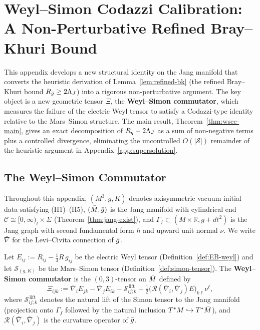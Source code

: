 \section{Weyl--Simon Codazzi Calibration: A Non-Perturbative Refined Bray--Khuri Bound}\label{app:weyl-simon}

This appendix develops a new structural identity on the Jang manifold that converts the heuristic derivation of Lemma~\ref{lem:refined-bk} (the refined Bray--Khuri bound $R_{\bar{g}}\geq 2\Lambda_J$) into a rigorous non-perturbative argument. The key object is a new geometric tensor $\Xi$, the \textbf{Weyl--Simon commutator}, which measures the failure of the electric Weyl tensor to satisfy a Codazzi-type identity relative to the Mars--Simon structure. The main result, Theorem~\ref{thm:wscc-main}, gives an exact decomposition of $R_{\bar{g}}-2\Lambda_J$ as a sum of non-negative terms plus a controlled divergence, eliminating the uncontrolled $O(|\mathcal{S}|)$ remainder of the heuristic argument in Appendix~\ref{app:supersolution}.

\subsection{The Weyl--Simon Commutator}

Throughout this appendix, $(M^3, g, K)$ denotes axisymmetric vacuum initial data satisfying (H1)--(H5), $(\bar{M}, \bar{g})$ is the Jang manifold with cylindrical end $\mathcal{C}\cong[0,\infty)_t\times\Sigma$ (Theorem~\ref{thm:jang-exist}), and $\Gamma_f\subset (M\times\mathbb{R}, g+dt^2)$ is the Jang graph with second fundamental form $h$ and upward unit normal $\nu$. We write $\bar\nabla$ for the Levi--Civita connection of $\bar{g}$.

\begin{definition}\label{def:wscc}
Let $E_{ij}:=R_{ij}-\tfrac{1}{3}R\,g_{ij}$ be the electric Weyl tensor (Definition~\ref{def:EB-weyl}) and let $\mathcal{S}_{(g,K)}$ be the Mars--Simon tensor (Definition~\ref{def:simon-tensor}). The \textbf{Weyl--Simon commutator} is the $(0,3)$-tensor on $\bar{M}$ defined by
\begin{equation}\label{eq:wscc-def}
\Xi_{ijk} := \bar\nabla_i E_{jk} - \bar\nabla_j E_{ik} - \mathcal{S}_{ij;k}^{\,\mathrm{lift}} + \tfrac{1}{2}\bigl(\mathcal{R}(\bar\nabla_i,\bar\nabla_j)E\bigr)_{k\ell}\nu^\ell,
\end{equation}
where $\mathcal{S}_{ij;k}^{\,\mathrm{lift}}$ denotes the natural lift of the Simon tensor to the Jang manifold (projection onto $\Gamma_f$ followed by the natural inclusion $T^*M\hookrightarrow T^*\bar{M}$), and $\mathcal{R}(\bar\nabla_i,\bar\nabla_j)$ is the curvature operator of $\bar{g}$.
\end{definition}

